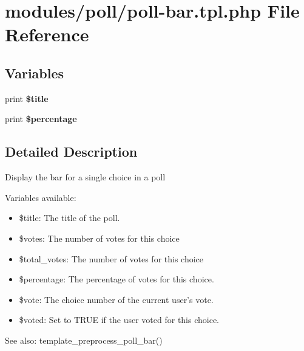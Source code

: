 \hypertarget{poll-bar_8tpl_8php}{
\section{modules/poll/poll-bar.tpl.php File Reference}
\label{poll-bar_8tpl_8php}
}
\subsection*{Variables}
\begin{CompactItemize}
\item 
\hypertarget{poll-bar_8tpl_8php_ec2795512d255332f57cacd930a090b4}{
print \textbf{\$title}}
\label{poll-bar_8tpl_8php_ec2795512d255332f57cacd930a090b4}

\item 
\hypertarget{poll-bar_8tpl_8php_271a067b3e16b6916b6d2fb7961ccd85}{
print \textbf{\$percentage}}
\label{poll-bar_8tpl_8php_271a067b3e16b6916b6d2fb7961ccd85}

\end{CompactItemize}


\subsection{Detailed Description}
Display the bar for a single choice in a poll

Variables available:\begin{itemize}
\item \$title: The title of the poll.\item \$votes: The number of votes for this choice\item \$total\_\-votes: The number of votes for this choice\item \$percentage: The percentage of votes for this choice.\item \$vote: The choice number of the current user's vote.\item \$voted: Set to TRUE if the user voted for this choice.\end{itemize}


\begin{Desc}
\item[See also:]template\_\-preprocess\_\-poll\_\-bar() \end{Desc}
